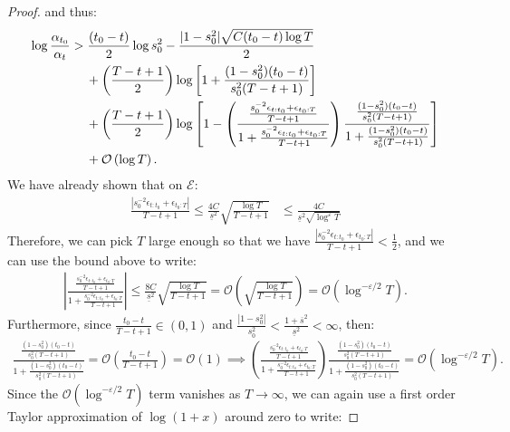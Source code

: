 \begin{proof}
and thus:
\begin{align}
    \log \frac{\alpha_{t_0}}{\alpha_t} &> \frac{(t_0-t)}{2}\log s_0^2  - \frac{|1 - s_0^2|\sqrt{C(t_0-t)\log T}}{2} \notag \\
    &\quad\: + \left(\frac{T - t +1}{2}\right)\log\left[1 + \frac{(1 - s_0^2)(t_0 - t)}{s_0^{2}(T-t+1)}\right] \notag \\
    &\quad\: + \left(\frac{T - t +1}{2}\right)\log\left[1 - \left(\frac{\frac{s_0^{-2}\epsilon_{t:t_0} + \epsilon_{t_0:T}}{T-t+1}}{1 + \frac{s_0^{-2}\epsilon_{t:t_0} + \epsilon_{t_0:T}}{T-t+1}}\right)\frac{\frac{(1 - s_0^2)(t_0 - t)}{s_0^{2}(T-t+1)}}{1 + \frac{(1 - s_0^2)(t_0 - t)}{s_0^{2}(T-t+1)}}\right]  \notag \\
    &\quad\: + \mathcal{O}\left(\log T\right). \label{eq:thm3-cs2-bd3}
\end{align}
We have already shown that on $\mathcal{E}$: 
\begin{align*}
    \frac{|s_0^{-2} \epsilon_{t:t_0} + \epsilon_{t_0:T}|}{T-t+1} \leq \frac{4C}{\underline{s}^{2}}\sqrt{\frac{\log T}{T-t+1}} &\leq \frac{4C}{\underline{s}^2\sqrt{\log^{\varepsilon} T}}
\end{align*}
Therefore, we can pick $T$ large enough so that we have $ \frac{|s_0^{-2} \epsilon_{t:t_0} + \epsilon_{t_0:T}|}{T-t+1}  < \frac{1}{2}$, and we can use the bound above to write: 
\begin{align*}
    \left|\frac{\frac{s_0^{-2}\epsilon_{t:t_0} + \epsilon_{t_0:T}}{T-t+1}}{1 + \frac{s_0^{-2}\epsilon_{t:t_0} + \epsilon_{t_0:T}}{T-t+1}}\right| \leq  \frac{8C}{\underline{s}^{2}}\sqrt{\frac{\log T}{T-t+1}} = \mathcal{O}\left(\sqrt{\frac{\log T}{T-t+1}}\right) = \mathcal{O}(\log^{-\varepsilon/2} T) .
\end{align*}
Furthermore, since $\frac{t_0 - t}{T-t+1} \in (0,1)$ and $\frac{|1-s_0^2|}{s_0^2} < \frac{1+\overline{s}^2}{\underline{s}^2} < \infty$, then:
\small
\begin{align*}
     \frac{\frac{(1 - s_0^2)(t_0 - t)}{s_0^{2}(T-t+1)}}{1 + \frac{(1 - s_0^2)(t_0 - t)}{s_0^{2}(T-t+1)}} = \mathcal{O}\left(\frac{t_0-t}{T-t+1}\right) = \mathcal{O}(1) \implies \left(\frac{\frac{s_0^{-2}\epsilon_{t:t_0} + \epsilon_{t_0:T}}{T-t+1}}{1 + \frac{s_0^{-2}\epsilon_{t:t_0} + \epsilon_{t_0:T}}{T-t+1}}\right)\frac{\frac{(1 - s_0^2)(t_0 - t)}{s_0^{2}(T-t+1)}}{1 + \frac{(1 - s_0^2)(t_0 - t)}{s_0^{2}(T-t+1)}} = \mathcal{O}(\log^{-\varepsilon/2} T).
\end{align*}
\normalsize
Since the $\mathcal{O}(\log^{-\varepsilon/2} T)$ term vanishes as $T \to \infty$, we can again use a first order Taylor approximation of $\log(1+x)$ around zero to write:

\end{proof}
